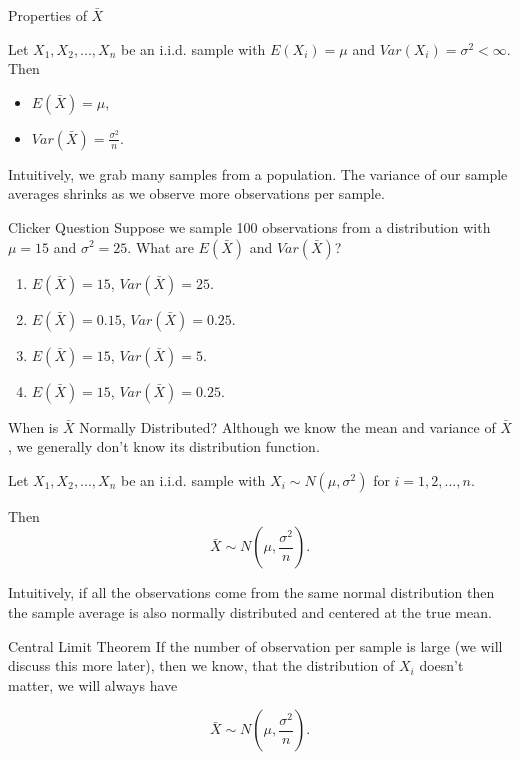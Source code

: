 \documentclass{beamer}
\begin{document}
\begin{frame}{Properties of $\bar{X}$}
	\begin{theorem}
		Let $X_1,X_2,...,X_n$ be an i.i.d. sample with $E(X_i) = \mu$ and $Var(X_i) = \sigma^2<\infty$. Then
		\begin{itemize}
			\item $E(\bar{X}) = \mu$,
			\item $Var(\bar{X}) = \frac{\sigma^2}{n}$.
		\end{itemize}
	\end{theorem}
	
	Intuitively, we grab many samples from a population. The variance of our sample averages shrinks as we observe more observations per sample. 
\end{frame}

\begin{frame}{Clicker Question}
	Suppose we sample 100 observations from a distribution with $\mu = 15$ and $\sigma^2 = 25$. What are $E(\bar{X})$ and $Var(\bar{X})$?

	\begin{enumerate}[label=(\alph*)]
		\item $E(\bar{X}) = 15$, $Var(\bar{X}) = 25$.
		\item $E(\bar{X}) = 0.15$, $Var(\bar{X}) = 0.25$.
		\item $E(\bar{X}) = 15$, $Var(\bar{X}) = 5$.
		\item $E(\bar{X}) = 15$, $Var(\bar{X}) = 0.25$.
	\end{enumerate}
\end{frame}


\begin{frame}{When is $\bar{X}$ Normally Distributed?}
	Although we know the mean and variance of $\bar{X}$, we generally don't know its distribution function. 

	\begin{theorem}
		\vspace{2.5mm}
		Let $X_1,X_2,...,X_n$ be an i.i.d. sample with $X_i \sim N(\mu, \sigma^2)$ for $i=1,2,...,n$. 
		
		Then $$
			\bar{X} \sim N(\mu, \frac{\sigma^2}{n}).
		$$
	\end{theorem}
	
	Intuitively, if all the observations come from the same normal distribution then the sample average is also normally distributed and centered at the true mean.
\end{frame}

\begin{frame}{Central Limit Theorem}
	If the number of observation per sample is large (we will discuss this more later), then we know, that the distribution of $X_i$ doesn't matter, we will always have 
	
	$$
		\bar{X} \sim N(\mu, \frac{\sigma^2}{n}).
	$$ 
\end{frame}
\end{document}

